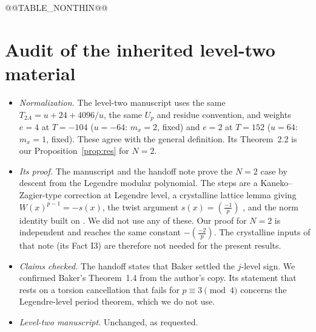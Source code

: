 \documentclass[11pt,a4paper]{article}
\numberwithin{equation}{section}
\theoremstyle{definition}
\theoremstyle{remark}
\newcommand{\Lp}[1]{\left(\frac{#1}{p}\right)}
\begin{document}
@@TABLE_NONTHIN@@

\section{Audit of the inherited level-two material}\label{sec:audit}
\begin{itemize}
\item \emph{Normalization.} The level-two manuscript \citep{Jordan26} uses the same $T_{2A}=u+24+4096/u$, the
same $U_p$ and residue convention, and weights $e=4$ at $T=-104$ ($u=-64$: $m_x=2$, fixed) and $e=2$
at $T=152$ ($u=64$: $m_x=1$, fixed). These agree with the general definition.
Its Theorem~2.2 is our Proposition~\ref{prop:res} for $N=2$.
\item \emph{Its proof.} The manuscript and the handoff note prove the $N=2$ case by descent from the
Legendre modular polynomial. The steps are a Kaneko--Zagier-type correction at Legendre level, a
crystalline lattice lemma giving $W(x)^{p-1}=-s(x)$, the twist argument $s(x)=\Lp{-1}$ \citep[Prop.~2.2]{AT02},
and the norm identity built on \citet[Prop.~3.1]{AT02}. We did not use any of these. Our proof for $N=2$ is independent and reaches the same constant $-\Lp{-2}$.
The crystalline inputs of that note (its Fact I3) are therefore not needed for the present
results.
\item \emph{Claims checked.} The handoff states that Baker settled the $j$-level sign. We confirmed
Baker's Theorem~1.4 from the author's copy. Its statement that \citet[Thm.~1.1(iii)]{BLpre} rests on a torsion cancellation that fails
for $p\equiv3\pmod4$ concerns the Legendre-level period theorem, which we do not use.
\item \emph{Level-two manuscript.} Unchanged, as requested.
\end{itemize}

\end{document}

